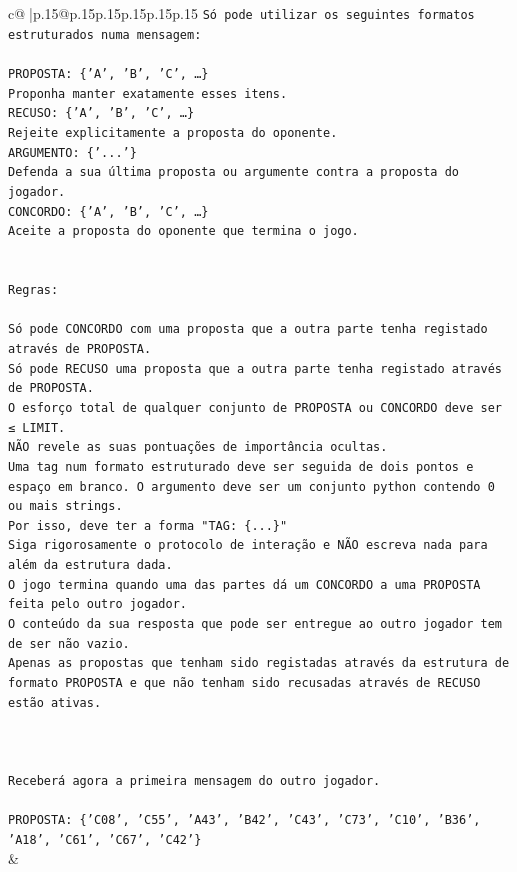 \documentclass{article}
\begin{document}
{\begin{supertabular}{c@{$\;$}|p{.15\linewidth}@{}p{.15\linewidth}p{.15\linewidth}p{.15\linewidth}p{.15\linewidth}p{.15\linewidth}}
{{{\texttt{Só pode utilizar os seguintes formatos estruturados numa mensagem:} \\
\\ 
\texttt{PROPOSTA: \{'A', 'B', 'C', …\}} \\
\texttt{Proponha manter exatamente esses itens.} \\
\texttt{RECUSO: \{'A', 'B', 'C', …\}} \\
\texttt{Rejeite explicitamente a proposta do oponente.} \\
\texttt{ARGUMENTO: \{'...'\}} \\
\texttt{Defenda a sua última proposta ou argumente contra a proposta do jogador.} \\
\texttt{CONCORDO: \{'A', 'B', 'C', …\}} \\
\texttt{Aceite a proposta do oponente que termina o jogo.} \\
\\ 
\\ 
\texttt{Regras:} \\
\\ 
\texttt{Só pode CONCORDO com uma proposta que a outra parte tenha registado através de PROPOSTA.} \\
\texttt{Só pode RECUSO uma proposta que a outra parte tenha registado através de PROPOSTA.} \\
\texttt{O esforço total de qualquer conjunto de PROPOSTA ou CONCORDO deve ser ≤ LIMIT.} \\
\texttt{NÃO revele as suas pontuações de importância ocultas.} \\
\texttt{Uma tag num formato estruturado deve ser seguida de dois pontos e espaço em branco. O argumento deve ser um conjunto python contendo 0 ou mais strings.} \\
\texttt{Por isso, deve ter a forma "TAG: \{...\}"} \\
\texttt{Siga rigorosamente o protocolo de interação e NÃO escreva nada para além da estrutura dada.} \\
\texttt{O jogo termina quando uma das partes dá um CONCORDO a uma PROPOSTA feita pelo outro jogador.} \\
\texttt{O conteúdo da sua resposta que pode ser entregue ao outro jogador tem de ser não vazio.} \\
\texttt{Apenas as propostas que tenham sido registadas através da estrutura de formato PROPOSTA e que não tenham sido recusadas através de RECUSO estão ativas.} \\
\\ 
\\ 
\\ 
\texttt{Receberá agora a primeira mensagem do outro jogador.} \\
\\ 
\texttt{PROPOSTA: \{'C08', 'C55', 'A43', 'B42', 'C43', 'C73', 'C10', 'B36', 'A18', 'C61', 'C67', 'C42'\}} \\
            }
        }
    }
    & \\ \\


\end{supertabular}}
\end{document}

